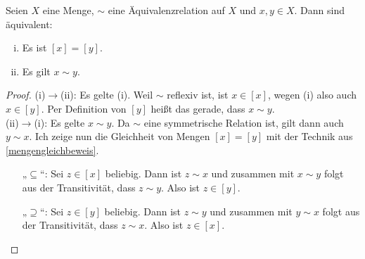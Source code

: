 \begin{satz} \label{aequiklassegleich}
    Seien $X$ eine Menge, $\sim$ eine Äquivalenzrelation auf $X$ und $x,y\in X$. Dann sind äquivalent:
    \begin{enumerate}[(i)]
        \item Es ist $[x]=[y]$.
        \item Es gilt $x\sim y$.
    \end{enumerate}
\end{satz}
\begin{proof}
    (i)$\to$(ii): Es gelte (i). Weil $\sim$ reflexiv ist, ist $x\in [x]$, wegen (i) also auch $x\in [y]$. Per Definition von $[y]$ heißt das gerade, dass $x\sim y$. \\[0.5em]
    (ii)$\to$(i): Es gelte $x\sim y$. Da $\sim$ eine symmetrische Relation ist, gilt dann auch $y\sim x$. Ich zeige nun die Gleichheit von Mengen $[x]=[y]$ mit der Technik aus \cref{mengengleichbeweis}.
        \begin{itemize}
            \item[„$\subseteq$“:] Sei $z\in [x]$ beliebig. Dann ist $z\sim x$ und zusammen mit $x\sim y$ folgt aus der Transitivität, dass $z\sim y$. Also ist $z\in [y]$.
            \item[„$\supseteq$“:] Sei $z\in [y]$ beliebig. Dann ist $z\sim y$ und zusammen mit $y\sim x$ folgt aus der Transitivität, dass $z\sim x$. Also ist $z\in [x]$. \qedhere
        \end{itemize}
\end{proof}


